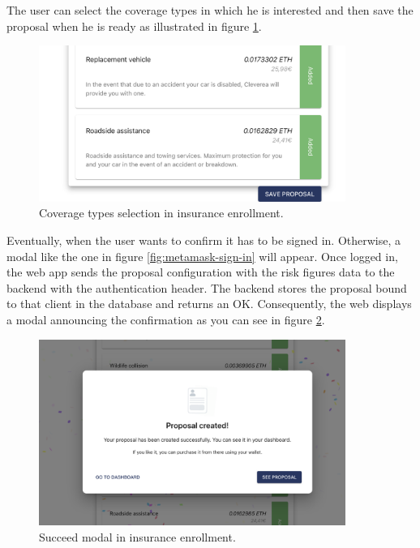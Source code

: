 {The user can select the coverage types in which he is interested and then save the proposal when he is ready as illustrated in figure \ref{fig:checkout-coverage-selection-2}.

\begin{figure}[H]
\centering
\includegraphics[width=10cm]{img/results/checkout-coverage-selection-2.png}
\caption[Insurechain: Coverage types selection in insurance enrollment]{\footnotesize{Coverage types selection in insurance enrollment.}}
\label{fig:checkout-coverage-selection-2}
\end{figure}

Eventually, when the user wants to confirm it has to be signed in. Otherwise, a modal like the one in figure \ref{fig:metamask-sign-in} will appear. Once logged in, the web app sends the proposal configuration with the risk figures data to the backend with the authentication header. The backend stores the proposal bound to that client in the database and returns an OK. Consequently, the web displays a modal announcing the confirmation as you can see in figure \ref{fig:checkout-succeed-modal}.

\begin{figure}[H]
\centering
\includegraphics[width=10cm]{img/results/checkout-succeed.png}
\caption[Insurechain: Succeed modal in insurance enrollment]{\footnotesize{Succeed modal in insurance enrollment.}}
\label{fig:checkout-succeed-modal}
\end{figure}
}

